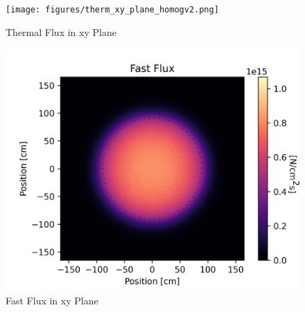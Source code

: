 \begin{figure}[H]
\centering

  \texttt{[image: figures/therm\_xy\_plane\_homogv2.png]}
  \caption{Thermal Flux in xy Plane}
  \label{fig:hom-plane-therm}

\end{figure}


\begin{figure}[H]
\centering

 \includegraphics[width=1.0\linewidth]{figures/fast_xy_plane_homogv2.png}
 \caption{Fast Flux in xy Plane}
 \label{fig:hom-plane-fast}

\end{figure}